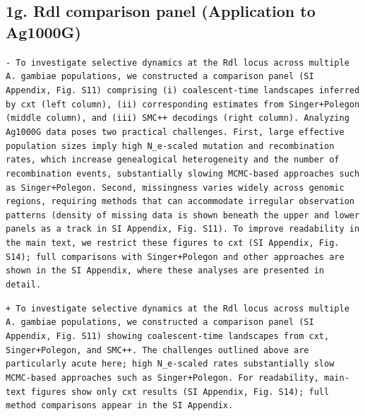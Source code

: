\documentclass[10pt]{article}
\newcommand{\rem}[1]{\par\noindent\colorbox{rembg}{\parbox{\dimexpr\linewidth-2\fboxsep}{\small\textcolor{remtext}{\texttt{-\ #1}}}}}
\newcommand{\add}[1]{\par\noindent\colorbox{addbg}{\parbox{\dimexpr\linewidth-2\fboxsep}{\small\textcolor{addtext}{\texttt{+\ #1}}}}}
\begin{document}
\subsection*{\small 1g. Rdl comparison panel (Application to Ag1000G)}
\begin{mdframed}[style=diffbox]
\rem{To investigate selective dynamics at the Rdl locus across multiple A. gambiae populations, we constructed a comparison panel (SI Appendix, Fig. S11) comprising (i) coalescent-time landscapes inferred by cxt (left column), (ii) corresponding estimates from Singer+Polegon (middle column), and (iii) SMC++ decodings (right column). Analyzing Ag1000G data poses two practical challenges. First, large effective population sizes imply high N\_e-scaled mutation and recombination rates, which increase genealogical heterogeneity and the number of recombination events, substantially slowing MCMC-based approaches such as Singer+Polegon. Second, missingness varies widely across genomic regions, requiring methods that can accommodate irregular observation patterns (density of missing data is shown beneath the upper and lower panels as a track in SI Appendix, Fig. S11). To improve readability in the main text, we restrict these figures to cxt (SI Appendix, Fig. S14); full comparisons with Singer+Polegon and other approaches are shown in the SI Appendix, where these analyses are presented in detail.}
\add{To investigate selective dynamics at the Rdl locus across multiple A. gambiae populations, we constructed a comparison panel (SI Appendix, Fig. S11) showing coalescent-time landscapes from cxt, Singer+Polegon, and SMC++. The challenges outlined above are particularly acute here; high N\_e-scaled rates substantially slow MCMC-based approaches such as Singer+Polegon. For readability, main-text figures show only cxt results (SI Appendix, Fig. S14); full method comparisons appear in the SI Appendix.}
\end{mdframed}
\end{document}
